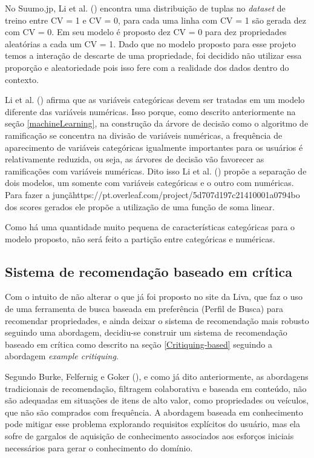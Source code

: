 No Suumo.jp, Li et al. (\citeyear{Summo:2017}) encontra uma distribuição de tuplas no \textit{dataset} de treino entre CV = 1 e CV = 0, para cada uma linha com CV = 1 são gerada dez com CV = 0. Em seu modelo é proposto dez CV = 0 para dez propriedades aleatórias a cada um CV = 1. Dado que no modelo proposto para esse projeto temos a interação de descarte de uma propriedade, foi decidido não utilizar essa proporção e aleatoriedade pois isso fere com a  realidade dos dados dentro do contexto.

Li et al. (\citeyear{Summo:2017}) afirma que as variáveis categóricas devem ser tratadas em um modelo diferente das variáveis numéricas. Isso porque, como descrito anteriormente na seção \ref{machineLearning}, na construção da árvore de decisão como o algoritmo de ramificação se concentra na divisão de variáveis numéricas, a frequência de aparecimento de variáveis categóricas igualmente importantes para os usuários é relativamente reduzida, ou seja, as árvores de decisão vão favorecer as ramificações com variáveis numéricas. Dito isso Li et al. (\citeyear{Summo:2017}) propõe a separação de dois modelos, um somente com variáveis categóricas e o outro com numéricas. Para fazer a junçãhttps://pt.overleaf.com/project/5d707d197c21410001a0794bo dos scores gerados ele propõe a utilização de uma função de soma linear.

Como há uma quantidade muito pequena de características categóricas para o modelo proposto, não será feito a partição entre categóricas e numéricas.

\subsection{Sistema de recomendação baseado em crítica}

Com o intuito de não alterar o que já foi proposto no site da Liva, que faz o uso de uma ferramenta de busca baseada em preferência (Perfil de Busca) para recomendar propriedades, e ainda deixar o sistema de recomendação mais robusto seguindo uma abordagem, decidiu-se construir um sistema de recomendação baseado em crítica como descrito na seção \ref{Critiquing-based} seguindo a abordagem \textit{example critiquing}.
	
Segundo Burke, Felfernig e Goker (\citeyear{Burke}), e como já dito anteriormente, as abordagens tradicionais de recomendação, filtragem colaborativa e baseada em conteúdo, não são adequadas em situações de itens de alto valor, como propriedades ou veículos, que não são comprados com frequência. A abordagem baseada em conhecimento pode mitigar esse problema explorando requisitos explícitos do usuário, mas ela sofre de gargalos de aquisição de conhecimento associados aos esforços iniciais necessários para gerar o conhecimento do domínio.

